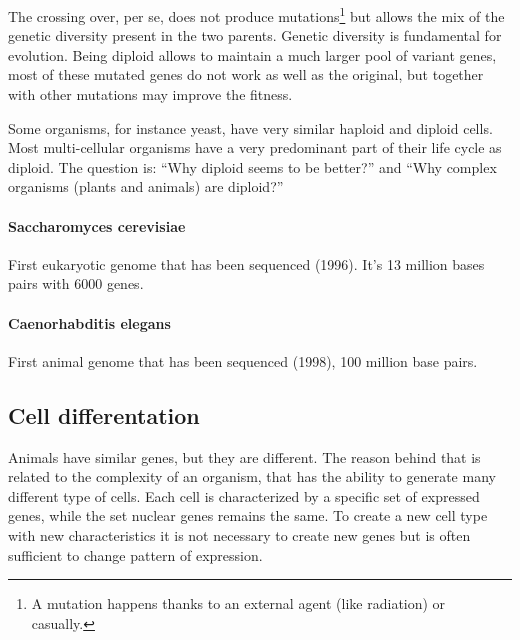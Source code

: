 The crossing over, per se, does not produce mutations\footnote{A mutation
happens thanks to an external agent (like radiation) or casually.} but allows
the mix of the genetic diversity present in the two parents. Genetic diversity
is fundamental for evolution. Being diploid allows to maintain a much larger
pool of variant genes, most of these mutated genes do not work as well as the
original, but together with other mutations may improve the fitness.

Some organisms, for instance yeast, have very similar haploid and diploid
cells. Most multi-cellular organisms have a very predominant part of their life
cycle as diploid. The question is: ``Why diploid seems to be better?'' and ``Why
complex organisms (plants and animals) are diploid?''

\paragraph*{Saccharomyces cerevisiae}
First eukaryotic genome that has been sequenced (1996). It's 13 million bases
pairs with 6000 genes.

\paragraph*{Caenorhabditis elegans}
First animal genome that has been sequenced (1998), 100 million base pairs.

\subsection{Cell differentation}

Animals have similar genes, but they are different. The reason behind that is
related to the complexity of an organism, that has the ability to generate many
different type of cells.
Each cell is characterized by a specific set of expressed genes, while the set
nuclear genes remains the same. To create a new cell type with new
characteristics it is not necessary to create new genes but is often sufficient
to change pattern of expression.
